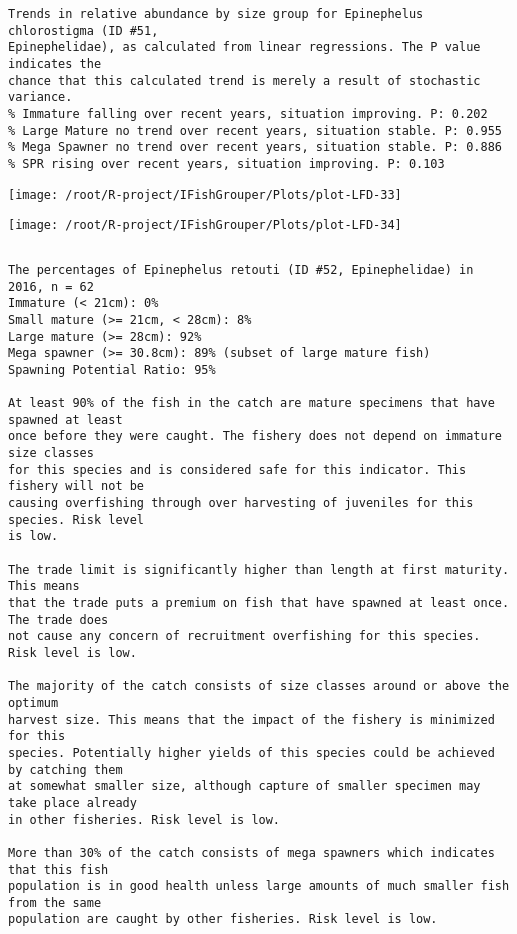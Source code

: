 \documentclass{report}\usepackage[]{graphicx}\usepackage[]{color}
\makeatletter
\def\maxwidth{ %
  \ifdim\Gin@nat@width>\linewidth
    \linewidth
  \else
    \Gin@nat@width
  \fi
}
\newenvironment{kframe}{%
 \def\at@end@of@kframe{}%
 \ifinner\ifhmode%
  \def\at@end@of@kframe{\end{minipage}}%
  \begin{minipage}{\columnwidth}%
 \fi\fi%
 \def\FrameCommand##1{\hskip\@totalleftmargin \hskip-\fboxsep
 \colorbox{shadecolor}{##1}\hskip-\fboxsep
     \hskip-\linewidth \hskip-\@totalleftmargin \hskip\columnwidth}%
 \MakeFramed {\advance\hsize-\width
   \@totalleftmargin\z@ \linewidth\hsize
   \@setminipage}}%
 {\par\unskip\endMakeFramed%
 \at@end@of@kframe}
\newenvironment{knitrout}{}{} %
\makeatother
\begin{document}
\begin{knitrout}
\begin{kframe}
\begin{verbatim}
Trends in relative abundance by size group for Epinephelus chlorostigma (ID #51,
Epinephelidae), as calculated from linear regressions. The P value indicates the
chance that this calculated trend is merely a result of stochastic variance.
% Immature falling over recent years, situation improving. P: 0.202
% Large Mature no trend over recent years, situation stable. P: 0.955
% Mega Spawner no trend over recent years, situation stable. P: 0.886
% SPR rising over recent years, situation improving. P: 0.103
\end{verbatim}
\end{kframe}
\texttt{[image: /root/R-project/IFishGrouper/Plots/plot-LFD-33]} 

\texttt{[image: /root/R-project/IFishGrouper/Plots/plot-LFD-34]} 
\begin{kframe}\begin{verbatim}
\end{verbatim}
\end{kframe}
\clearpage
\newpage
\begin{kframe}\begin{verbatim}The percentages of Epinephelus retouti (ID #52, Epinephelidae) in 2016, n = 62
Immature (< 21cm): 0%
Small mature (>= 21cm, < 28cm): 8%
Large mature (>= 28cm): 92%
Mega spawner (>= 30.8cm): 89% (subset of large mature fish)
Spawning Potential Ratio: 95%
 
At least 90% of the fish in the catch are mature specimens that have spawned at least
once before they were caught. The fishery does not depend on immature size classes
for this species and is considered safe for this indicator. This fishery will not be
causing overfishing through over harvesting of juveniles for this species. Risk level
is low.

The trade limit is significantly higher than length at first maturity.  This means
that the trade puts a premium on fish that have spawned at least once. The trade does
not cause any concern of recruitment overfishing for this species. Risk level is low.

The majority of the catch consists of size classes around or above the optimum
harvest size. This means that the impact of the fishery is minimized for this
species. Potentially higher yields of this species could be achieved by catching them
at somewhat smaller size, although capture of smaller specimen may take place already
in other fisheries. Risk level is low.

More than 30% of the catch consists of mega spawners which indicates that this fish
population is in good health unless large amounts of much smaller fish from the same
population are caught by other fisheries. Risk level is low.
 

\end{verbatim}
\end{kframe}
\end{knitrout}
\end{document}

